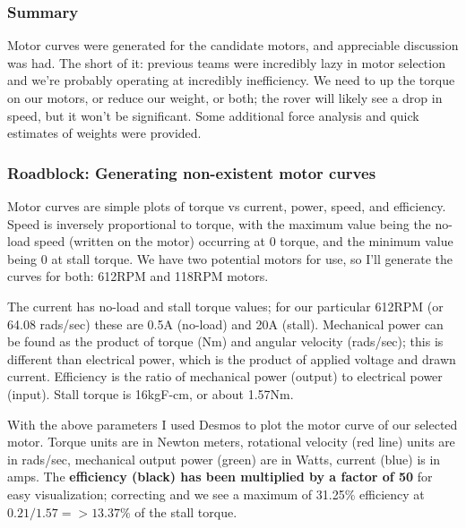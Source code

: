 \documentclass[a4paper, 10pt]{article}
\begin{document}
		\subsubsection{Summary}
		Motor curves were generated for the candidate motors, and appreciable discussion was had. The short of it: previous teams were incredibly lazy in motor selection and we're probably operating at incredibly inefficiency. We need to up the torque on our motors, or reduce our weight, or both; the rover will likely see a drop in speed, but it won't be significant. Some additional force analysis and quick estimates of weights were provided. 		
		
		\subsubsection{Roadblock: Generating non-existent motor curves}
		Motor curves are simple plots of torque vs current, power, speed, and efficiency. Speed is inversely proportional to torque, with the maximum value being the no-load speed (written on the motor) occurring at 0 torque, and the minimum value being 0 at stall torque. We have two potential motors for use, so I'll generate the curves for both: 612RPM and 118RPM motors.
		
		The current has no-load and stall torque values; for our particular 612RPM (or 64.08 rads/sec) these are 0.5A (no-load) and 20A (stall). Mechanical power can be found as the product of torque (Nm) and angular velocity (rads/sec); this is different than electrical power, which is the product of applied voltage and drawn current. Efficiency is the ratio of mechanical power (output) to electrical power (input). Stall torque is 16kgF-cm, or about 1.57Nm.
		
		With the above parameters I used Desmos to plot the motor curve of our selected motor. Torque units are in Newton meters, rotational velocity (red line) units are in rads/sec, mechanical output power (green) are in Watts, current (blue) is in amps. The \textbf{efficiency (black) has been multiplied by a factor of 50} for easy visualization; correcting and we see a maximum of 31.25\% efficiency at $ 0.21/1.57 => 13.37\% $ of the stall torque.
		
\end{document}
